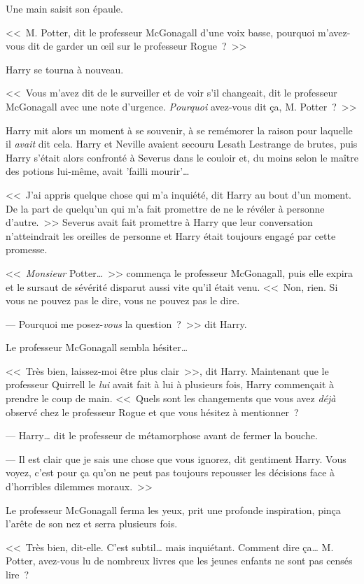 Une main saisit son épaule.

<<~M. Potter, dit le professeur McGonagall d'une voix basse, pourquoi m'avez-vous dit de garder un œil sur le professeur Rogue~?~>>

Harry se tourna à nouveau.

<<~Vous m'avez dit de le surveiller et de voir s'il changeait, dit le professeur McGonagall avec une note d'urgence. \emph{Pourquoi} avez-vous dit ça, M. Potter~?~>>

Harry mit alors un moment à se souvenir, à se remémorer la raison pour laquelle il \emph{avait} dit cela. Harry et Neville avaient secouru Lesath Lestrange de brutes, puis Harry s'était alors confronté à Severus dans le couloir et, du moins selon le maître des potions lui-même, avait 'failli mourir'…

<<~J'ai appris quelque chose qui m'a inquiété, dit Harry au bout d'un moment. De la part de quelqu'un qui m'a fait promettre de ne le révéler à personne d'autre.~>> Severus avait fait promettre à Harry que leur conversation n'atteindrait les oreilles de personne et Harry était toujours engagé par cette promesse.

<<~\emph{Monsieur} Potter…~>> commença le professeur McGonagall, puis elle expira et le sursaut de sévérité disparut aussi vite qu'il était venu. <<~Non, rien. Si vous ne pouvez pas le dire, vous ne pouvez pas le dire.

--- Pourquoi me posez-\emph{vous} la question~?~>> dit Harry.

Le professeur McGonagall sembla hésiter…

<<~Très bien, laissez-moi être plus clair~>>, dit Harry. Maintenant que le professeur Quirrell le \emph{lui} avait fait à lui à plusieurs fois, Harry commençait à prendre le coup de main. <<~Quels sont les changements que vous avez \emph{déjà} observé chez le professeur Rogue et que vous hésitez à mentionner~?

--- Harry… dit le professeur de métamorphose avant de fermer la bouche.

--- Il est clair que je sais une chose que vous ignorez, dit gentiment Harry. Vous voyez, c'est pour ça qu'on ne peut pas toujours repousser les décisions face à d'horribles dilemmes moraux.~>>

Le professeur McGonagall ferma les yeux, prit une profonde inspiration, pinça l'arête de son nez et serra plusieurs fois.

<<~Très bien, dit-elle. C'est subtil… mais inquiétant. Comment dire ça… M. Potter, avez-vous lu de nombreux livres que les jeunes enfants ne sont pas censés lire~?

